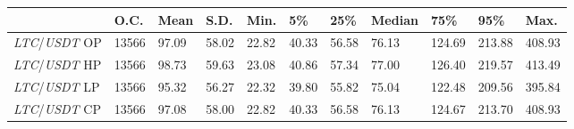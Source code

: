 \begin{tabular}{lllllllllll}
\toprule
 & \textbf{O.C.} & \textbf{Mean} & \textbf{S.D.} & \textbf{Min.} & \textbf{5\%} & \textbf{25\%} & \textbf{Median} & \textbf{75\%} & \textbf{95\%} & \textbf{Max.} \\
\midrule
\emph{LTC}/\emph{USDT} OP & 13566 & 97.09 & 58.02 & 22.82 & 40.33 & 56.58 & 76.13 & 124.69 & 213.88 & 408.93 \\
\emph{LTC}/\emph{USDT} HP & 13566 & 98.73 & 59.63 & 23.08 & 40.86 & 57.34 & 77.00 & 126.40 & 219.57 & 413.49 \\
\emph{LTC}/\emph{USDT} LP & 13566 & 95.32 & 56.27 & 22.32 & 39.80 & 55.82 & 75.04 & 122.48 & 209.56 & 395.84 \\
\emph{LTC}/\emph{USDT} CP & 13566 & 97.08 & 58.00 & 22.82 & 40.33 & 56.58 & 76.13 & 124.67 & 213.70 & 408.93 \\
\bottomrule
\end{tabular}
